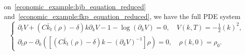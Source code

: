 on~\ref{economic_example:hjb_equation_reduced} and~\ref{economic_example:fkp_equation_reduced}, we have the full PDE system
\begin{equation}
    \begin{cases}
        \partial_t V +  \left(C {\bar k_t(\rho) - \delta}\right)k\partial_k V - 1  - \log(\partial_k V) = 0,  \quad V(k,T) = -\frac{1}{2}{(k)}^2,\\
        \partial_t \rho - \partial_k \left( \left[ \left(C {\bar k_t}(\rho) - \delta\right) k - {(\partial_k V)}^{-1} \right]\rho \right) = 0, \quad \rho(k,0) = \rho_0.
    \end{cases}
\end{equation}
\color{black}


